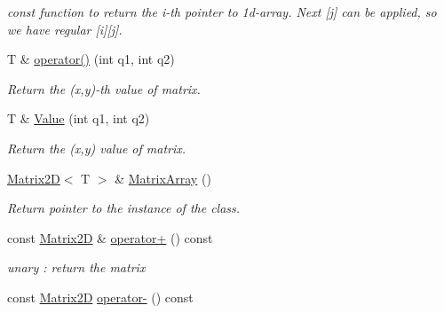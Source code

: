 \begin{DoxyCompactItemize}
\begin{DoxyCompactList}\small\item\em const function to return the i-\/th pointer to 1d-\/array. Next \mbox{[}j\mbox{]} can be applied, so we have regular \mbox{[}i\mbox{]}\mbox{[}j\mbox{]}. \end{DoxyCompactList}\item 
\hypertarget{class_matrix2_d_acfd8ca06a80f5881dec5670aff3ead08}{}T \& \hyperlink{class_matrix2_d_acfd8ca06a80f5881dec5670aff3ead08}{operator()} (int q1, int q2)\label{class_matrix2_d_acfd8ca06a80f5881dec5670aff3ead08}

\begin{DoxyCompactList}\small\item\em Return the (x,y)-\/th value of matrix. \end{DoxyCompactList}\item 
\hypertarget{class_matrix2_d_af131965968595b0bf6185d97ca10df1b}{}T \& \hyperlink{class_matrix2_d_af131965968595b0bf6185d97ca10df1b}{Value} (int q1, int q2)\label{class_matrix2_d_af131965968595b0bf6185d97ca10df1b}

\begin{DoxyCompactList}\small\item\em Return the (x,y) value of matrix. \end{DoxyCompactList}\item 
\hypertarget{class_matrix2_d_aeec48fb8757850e49ff94e1e710a90ac}{}\hyperlink{class_matrix2_d}{Matrix2\+D}$<$ T $>$ \& \hyperlink{class_matrix2_d_aeec48fb8757850e49ff94e1e710a90ac}{Matrix\+Array} ()\label{class_matrix2_d_aeec48fb8757850e49ff94e1e710a90ac}

\begin{DoxyCompactList}\small\item\em Return pointer to the instance of the class. \end{DoxyCompactList}\item 
\hypertarget{class_matrix2_d_af8b09772ab749859e32b780275161807}{}const \hyperlink{class_matrix2_d}{Matrix2\+D} \& \hyperlink{class_matrix2_d_af8b09772ab749859e32b780275161807}{operator+} () const \label{class_matrix2_d_af8b09772ab749859e32b780275161807}

\begin{DoxyCompactList}\small\item\em unary \+: return the matrix \end{DoxyCompactList}\item 
\hypertarget{class_matrix2_d_a5a2aab67f66e9bc1c4810fca00c844fa}{}const \hyperlink{class_matrix2_d}{Matrix2\+D} \hyperlink{class_matrix2_d_a5a2aab67f66e9bc1c4810fca00c844fa}{operator-\/} () const \label{class_matrix2_d_a5a2aab67f66e9bc1c4810fca00c844fa}


\end{DoxyCompactItemize}
